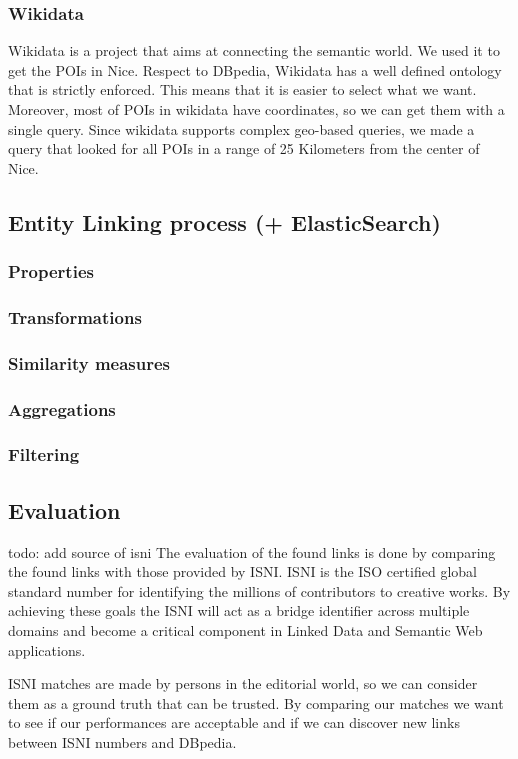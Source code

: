 \subsubsection{Wikidata}
Wikidata is a project that aims at connecting the semantic world. We used it to get the POIs in Nice. Respect to DBpedia, Wikidata has a well defined ontology that is strictly enforced. This means that it is easier to select what we want. Moreover, most of POIs in wikidata have coordinates, so we can get them with a single query. Since wikidata supports complex geo-based queries, we made a query that looked for all POIs in a range of 25 Kilometers from the center of Nice.


\subsection{Entity Linking process (+ ElasticSearch)}
\subsubsection{Properties}
\subsubsection{Transformations}
\subsubsection{Similarity measures}
\subsubsection{Aggregations}
\subsubsection{Filtering}
\subsection{Evaluation}
todo: add source of isni
The evaluation of the found links is done by comparing the found links with those provided by ISNI. ISNI is the ISO certified global standard number for identifying the millions of contributors to creative works. By achieving these goals the ISNI will act as a bridge identifier across multiple domains and become a critical component in Linked Data and Semantic Web applications.

ISNI matches are made by persons in the editorial world, so we can consider them as a ground truth that can be trusted. By comparing our matches we want to see if our performances are acceptable and if we can discover new links between ISNI numbers and DBpedia.

